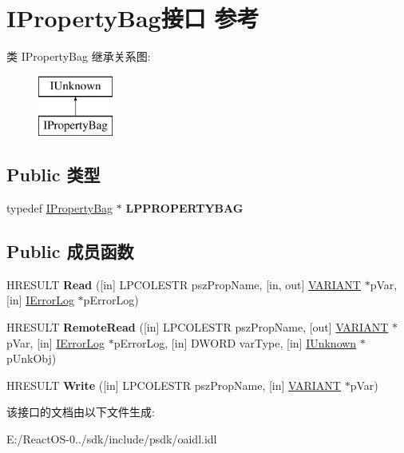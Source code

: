 \hypertarget{interface_i_property_bag}{}\section{I\+Property\+Bag接口 参考}
\label{interface_i_property_bag}
类 I\+Property\+Bag 继承关系图\+:\begin{figure}[H]
\begin{center}
\leavevmode
\includegraphics[height=2.000000cm]{interface_i_property_bag}
\end{center}
\end{figure}
\subsection*{Public 类型}
\begin{DoxyCompactItemize}
\item 
\mbox{\label{interface_i_property_bag_aa939e30aaff9a9ee3f7ab4093da5d714}} 
typedef \hyperlink{interface_i_property_bag}{I\+Property\+Bag} $\ast$ {\bfseries L\+P\+P\+R\+O\+P\+E\+R\+T\+Y\+B\+AG}
\end{DoxyCompactItemize}
\subsection*{Public 成员函数}
\begin{DoxyCompactItemize}
\item 
\mbox{\label{interface_i_property_bag_a8b5b195e200829e296077ee2c08646d0}} 
H\+R\+E\+S\+U\+LT {\bfseries Read} (\mbox{[}in\mbox{]} L\+P\+C\+O\+L\+E\+S\+TR psz\+Prop\+Name, \mbox{[}in, out\mbox{]} \hyperlink{structtag_v_a_r_i_a_n_t}{V\+A\+R\+I\+A\+NT} $\ast$p\+Var, \mbox{[}in\mbox{]} \hyperlink{interface_i_error_log}{I\+Error\+Log} $\ast$p\+Error\+Log)
\item 
\mbox{\label{interface_i_property_bag_a4a33d66b55f8ca87320dd99834637cf5}} 
H\+R\+E\+S\+U\+LT {\bfseries Remote\+Read} (\mbox{[}in\mbox{]} L\+P\+C\+O\+L\+E\+S\+TR psz\+Prop\+Name, \mbox{[}out\mbox{]} \hyperlink{structtag_v_a_r_i_a_n_t}{V\+A\+R\+I\+A\+NT} $\ast$p\+Var, \mbox{[}in\mbox{]} \hyperlink{interface_i_error_log}{I\+Error\+Log} $\ast$p\+Error\+Log, \mbox{[}in\mbox{]} D\+W\+O\+RD var\+Type, \mbox{[}in\mbox{]} \hyperlink{interface_i_unknown}{I\+Unknown} $\ast$p\+Unk\+Obj)
\item 
\mbox{\label{interface_i_property_bag_a811aacda8f4c4fba99fca4d70c099b8b}} 
H\+R\+E\+S\+U\+LT {\bfseries Write} (\mbox{[}in\mbox{]} L\+P\+C\+O\+L\+E\+S\+TR psz\+Prop\+Name, \mbox{[}in\mbox{]} \hyperlink{structtag_v_a_r_i_a_n_t}{V\+A\+R\+I\+A\+NT} $\ast$p\+Var)
\end{DoxyCompactItemize}


该接口的文档由以下文件生成\+:\begin{DoxyCompactItemize}
\item 
E\+:/\+React\+O\+S-\/0../sdk/include/psdk/oaidl.\+idl\end{DoxyCompactItemize}
